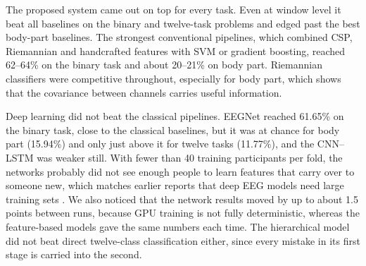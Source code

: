 \documentclass[pdflatex,sn-mathphys-num]{sn-jnl}%
\theoremstyle{thmstyleone}%
\theoremstyle{thmstyletwo}%
\theoremstyle{thmstylethree}%
\begin{document}
\begin{table}[htbp]
\centering
\caption{Best comparison models (window level unless stated, fold mean $\pm$ SD, \%). The neural networks and the hierarchical model used three folds for all tasks.}
\label{tab:baselines}
\end{table}

The proposed system came out on top for every task. Even at window level it beat all baselines on the binary and twelve-task problems and edged past the best body-part baselines. The strongest conventional pipelines, which combined CSP, Riemannian and handcrafted features with SVM or gradient boosting, reached 62--64\% on the binary task and about 20--21\% on body part. Riemannian classifiers were competitive throughout, especially for body part, which shows that the covariance between channels carries useful information.

Deep learning did not beat the classical pipelines. EEGNet reached 61.65\% on the binary task, close to the classical baselines, but it was at chance for body part (15.94\%) and only just above it for twelve tasks (11.77\%), and the CNN--LSTM was weaker still. With fewer than 40 training participants per fold, the networks probably did not see enough people to learn features that carry over to someone new, which matches earlier reports that deep EEG models need large training sets \citep{Roy2019,Altaheri2023}. We also noticed that the network results moved by up to about 1.5 points between runs, because GPU training is not fully deterministic, whereas the feature-based models gave the same numbers each time. The hierarchical model did not beat direct twelve-class classification either, since every mistake in its first stage is carried into the second.
\end{document}
